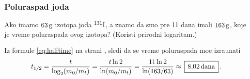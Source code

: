 \subsubsection{Poluraspad joda}

\def\iso#1-#2{\vphantom{\rm#2}^{#1}{\rm#2}}

\zadatak 
Ako imamo $63\,{\rm g}$ izotopa joda $\iso 131-I$, a znamo da smo pre 11 dana imali $163\,{\rm g}$, koje je vreme
poluraspada ovog izotopa? (Koristi prirodni logaritam.)

\resenje
Iz formule \eqref{eq:halftime} na strani \pageref{eq:halftime}, sledi da se vreme poluraspada
mo{\zv}e izra{\cv}unati
$$
\th
=\frac{t}{\logtwo(m_0 / m_t)}
=\frac{t\ln2}{\ln(m_0 / m_t)}
=\frac{11\ln2}{\ln(163/63)}
\approx\ram{8\.02\um{dana}}.
$$
